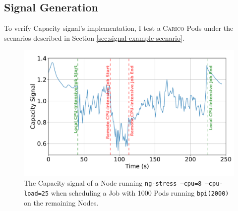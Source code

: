%
\subsection{Signal Generation}
%
To verify Capacity signal's implementation, I test a \textsc{Carico} Pods under
the scenarios described in Section \ref{sec:signal-example-scenario}.

\begin{figure}[ht!]
    \centering
    \includegraphics[width=\textwidth]{images/signal-with-cpu.pdf}
    \caption{The Capacity signal of a Node running \texttt{ng-stress --cpu=8
    --cpu-load=25} when scheduling a Job with 1000 Pods running
    \texttt{bpi(2000)} on the remaining Nodes.}
    \label{fig:signal-evaluation-cpu}
\end{figure}
%

